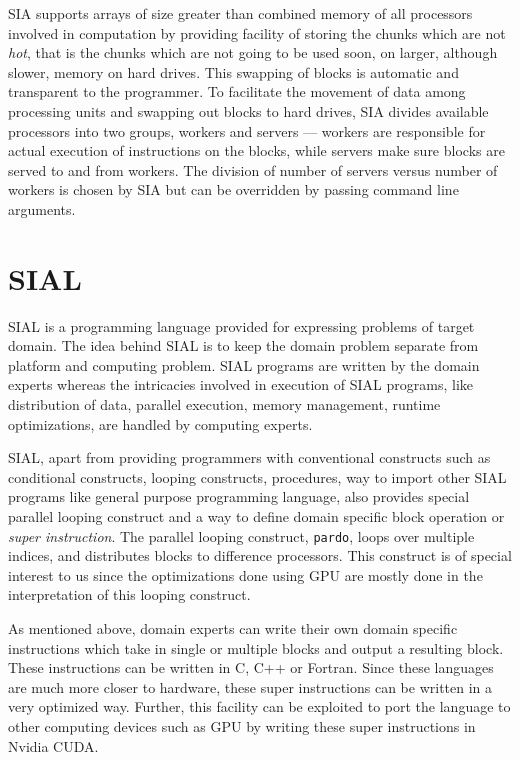 SIA supports arrays of size greater than combined memory of all processors
involved in computation by providing facility of storing the chunks which are
not \textit{hot}, that is the chunks which are not going to be used soon, on
larger, although slower, memory on hard drives. This swapping of blocks is automatic
and transparent to the programmer. To facilitate the movement of data among
processing units and swapping out blocks to hard drives, SIA divides available
processors into two groups, workers and servers --- workers are responsible for
actual execution of instructions on the blocks, while servers make sure blocks
are served to and from workers. The division of number of servers versus number
of workers is chosen by SIA but can be overridden by passing command line
arguments.

\section{SIAL}
SIAL is a programming language provided for expressing problems of target
domain. The idea behind SIAL is to keep the domain problem separate from
platform and computing problem. SIAL programs are written by the domain experts
whereas the intricacies involved in execution of SIAL programs, like distribution of
data, parallel execution, memory management, runtime optimizations, are handled
by computing experts.

SIAL, apart from providing programmers with conventional constructs such as
conditional constructs, looping constructs, procedures, way to import other SIAL
programs like general purpose programming language, also provides special parallel looping construct and a way
to define domain specific block operation or \textit{super instruction}. The
parallel looping construct, \texttt{pardo}, loops over multiple indices, and
distributes blocks to difference processors. This construct is of special
interest to us since the optimizations done using GPU are mostly done in the
interpretation of this looping construct.

As mentioned above, domain experts can write their own domain specific
instructions which take in single or multiple blocks and output a resulting block. These
instructions can be written in C, C++ or Fortran. Since these languages are much
more closer to hardware, these super instructions can be written in a very
optimized way. Further, this facility can be exploited to port the language to
other computing devices such as GPU by writing these super instructions in
Nvidia CUDA.

